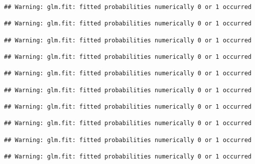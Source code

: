 \documentclass[
]{article}
\begin{document}
\begin{verbatim}
## Warning: glm.fit: fitted probabilities numerically 0 or 1 occurred

## Warning: glm.fit: fitted probabilities numerically 0 or 1 occurred

## Warning: glm.fit: fitted probabilities numerically 0 or 1 occurred

## Warning: glm.fit: fitted probabilities numerically 0 or 1 occurred

## Warning: glm.fit: fitted probabilities numerically 0 or 1 occurred

## Warning: glm.fit: fitted probabilities numerically 0 or 1 occurred

## Warning: glm.fit: fitted probabilities numerically 0 or 1 occurred

## Warning: glm.fit: fitted probabilities numerically 0 or 1 occurred

## Warning: glm.fit: fitted probabilities numerically 0 or 1 occurred

## Warning: glm.fit: fitted probabilities numerically 0 or 1 occurred
\end{verbatim}
\end{document}
